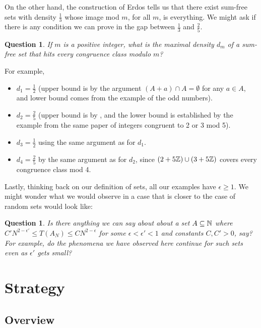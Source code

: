 \documentclass{report}
\newtheorem{question}[theorem]{Question}
\theoremstyle{remark}
\numberwithin{equation}{section}
\begin{document}
On the other hand, the construction of Erdos tells us that there exist
sum-free sets with density $\frac13$ whose image mod $m$, for all $m$,
is everything.  We might ask if there is any condition we can prove in
the gap between $\frac13$ and $\frac25$.

\begin{question}\label{qn:irregularity_density}
  If $m$ is a positive integer, what is the maximal density $d_m$ of a
  sum-free set that hits every congruence class modulo $m$?
\end{question}

For example, 

\begin{itemize}
\item $d_1 = \frac12$ (upper bound is by the argument $(A + a) \cap A =
  \emptyset$ for any $a\in A$, and lower bound comes from the example
  of the odd numbers).
\item $d_2 = \frac25$ (upper bound is by
  \cite{luczak:jct1995}, and the lower bound is established
  by the example from the same paper of integers congruent to 2 or 3
  mod 5).
\item $d_3 = \frac12$ using the same argument as for $d_1$.
\item $d_4 = \frac25$ by the same argument as for $d_2$, since
  $(2+5\mathbb{Z}) \cup (3+5\mathbb{Z})$ covers every congruence class mod 4.
\end{itemize}

Lastly, thinking back on our definition of \relevant sets, all our
examples have $\epsilon \geq 1$.  We might wonder what we would
observe in a case that is closer to the case of random sets would look
like: 

\begin{question}
  Is there anything we can say about about a set $A \subseteq \mathbb{N}$
  where $C'N^{2-\epsilon'} \leq T(A_N) \leq CN^{2-\epsilon}$ for some
  $\epsilon < \epsilon' < 1$ and constants $C, C' > 0$, say?  For
  example, do the phenomena we have observed here continue for such
  sets even as $\epsilon'$ gets small?
\end{question}

\chapter{Strategy}

\section{Overview}
\end{document}
